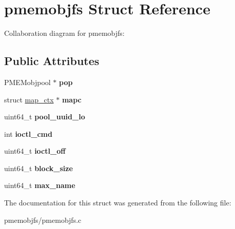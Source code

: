 \hypertarget{structpmemobjfs}{}\section{pmemobjfs Struct Reference}
\label{structpmemobjfs}


Collaboration diagram for pmemobjfs\+:
\subsection*{Public Attributes}
\begin{DoxyCompactItemize}
\item 
\mbox{\label{structpmemobjfs_a10c078222a95701ac2e5826ae1f041f4}} 
P\+M\+E\+Mobjpool $\ast$ {\bfseries pop}
\item 
\mbox{\label{structpmemobjfs_a0a9e64e8665d587e5a9178ee06aeebad}} 
struct \hyperlink{structmap__ctx}{map\+\_\+ctx} $\ast$ {\bfseries mapc}
\item 
\mbox{\label{structpmemobjfs_a600684525fc6c963cc548aff8885fd72}} 
uint64\+\_\+t {\bfseries pool\+\_\+uuid\+\_\+lo}
\item 
\mbox{\label{structpmemobjfs_af91de267bedb803db71152ed550c129d}} 
int {\bfseries ioctl\+\_\+cmd}
\item 
\mbox{\label{structpmemobjfs_a6a8072cbf2366afd90a227d10122ad12}} 
uint64\+\_\+t {\bfseries ioctl\+\_\+off}
\item 
\mbox{\label{structpmemobjfs_a3a8d0ea7dabaa6dc1792e34732c12336}} 
uint64\+\_\+t {\bfseries block\+\_\+size}
\item 
\mbox{\label{structpmemobjfs_a6ceb00274738f7e47aca8ee4787e9d75}} 
uint64\+\_\+t {\bfseries max\+\_\+name}
\end{DoxyCompactItemize}


The documentation for this struct was generated from the following file\+:\begin{DoxyCompactItemize}
\item 
pmemobjfs/pmemobjfs.\+c\end{DoxyCompactItemize}
